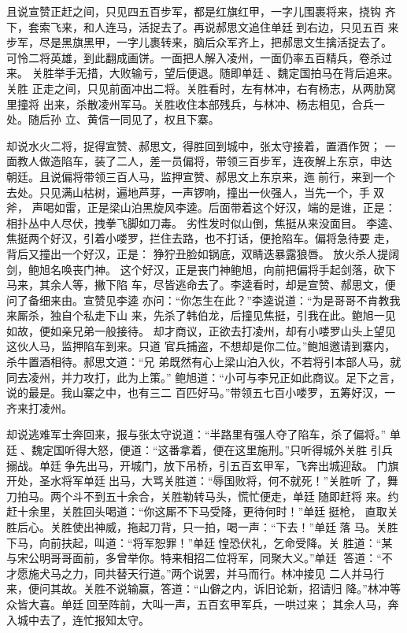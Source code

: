 且说宣赞正赶之间，只见四五百步军，都是红旗红甲，一字儿围裹将来，挠钩
齐下，套索飞来，和人连马，活捉去了。再说郝思文追住单廷到右边，只见五百
来步军，尽是黑旗黑甲，一字儿裹转来，脑后众军齐上，把郝思文生擒活捉去了。
可怜二将英雄，到此翻成画饼。一面把人解入凌州，一面仍率五百精兵，卷杀过来。
关胜举手无措，大败输亏，望后便退。随即单廷、魏定国拍马在背后追来。关胜
正走之间，只见前面冲出二将。关胜看时，左有林冲，右有杨志，从两肋窝里撞将
出来，杀散凌州军马。关胜收住本部残兵，与林冲、杨志相见，合兵一处。随后孙
立、黄信一同见了，权且下寨。

却说水火二将，捉得宣赞、郝思文，得胜回到城中，张太守接着，置酒作贺；
一面教人做造陷车，装了二人，差一员偏将，带领三百步军，连夜解上东京，申达
朝廷。且说偏将带领三百人马，监押宣赞、郝思文上东京来，迤前行，来到一个
去处。只见满山枯树，遍地芦芽，一声锣响，撞出一伙强人，当先一个，手双斧，
声喝如雷，正是梁山泊黑旋风李逵。后面带着这个好汉，端的是谁，正是：
相扑丛中人尽伏，拽拳飞脚如刀毒。
劣性发时似山倒，焦挺从来没面目。
李逵、焦挺两个好汉，引着小喽罗，拦住去路，也不打话，便抢陷车。偏将急待要
走，背后又撞出一个好汉，正是：
狰狞丑脸如锅底，双睛迭暴露狼唇。
放火杀人提阔剑，鲍旭名唤丧门神。
这个好汉，正是丧门神鲍旭，向前把偏将手起剑落，砍下马来，其余人等，撇下陷
车，尽皆逃命去了。李逵看时，却是宣赞、郝思文，便问了备细来由。宣赞见李逵
亦问：“你怎生在此？”李逵说道：“为是哥哥不肯教我来厮杀，独自个私走下山
来，先杀了韩伯龙，后撞见焦挺，引我在此。鲍旭一见如故，便如亲兄弟一般接待。
却才商议，正欲去打凌州，却有小喽罗山头上望见这伙人马，监押陷车到来。只道
官兵捕盗，不想却是你二位。”鲍旭邀请到寨内，杀牛置酒相待。郝思文道：“兄
弟既然有心上梁山泊入伙，不若将引本部人马，就同去凌州，并力攻打，此为上策。”
鲍旭道：“小可与李兄正如此商议。足下之言，说的最是。我山寨之中，也有三二
百匹好马。”带领五七百小喽罗，五筹好汉，一齐来打凌州。

却说逃难军士奔回来，报与张太守说道：“半路里有强人夺了陷车，杀了偏将。”
单廷、魏定国听得大怒，便道：“这番拿着，便在这里施刑。”只听得城外关胜
引兵搦战。单廷争先出马，开城门，放下吊桥，引五百玄甲军，飞奔出城迎敌。
门旗开处，圣水将军单廷出马，大骂关胜道：“辱国败将，何不就死！”关胜听
了，舞刀拍马。两个斗不到五十余合，关胜勒转马头，慌忙便走，单廷随即赶将
来。约赶十余里，关胜回头喝道：“你这厮不下马受降，更待何时！”单廷挺枪，
直取关胜后心。关胜使出神威，拖起刀背，只一拍，喝一声：“下去！”单廷落
马。关胜下马，向前扶起，叫道：“将军恕罪！”单廷惶恐伏礼，乞命受降。关
胜道：“某与宋公明哥哥面前，多曾举你。特来相招二位将军，同聚大义。”单廷
答道：“不才愿施犬马之力，同共替天行道。”两个说罢，并马而行。林冲接见
二人并马行来，便问其故。关胜不说输赢，答道：“山僻之内，诉旧论新，招请归
降。”林冲等众皆大喜。单廷回至阵前，大叫一声，五百玄甲军兵，一哄过来；
其余人马，奔入城中去了，连忙报知太守。

